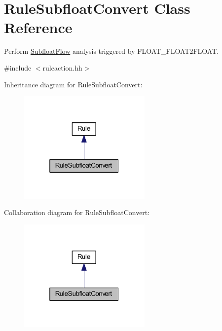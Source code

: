 \hypertarget{class_rule_subfloat_convert}{}\section{Rule\+Subfloat\+Convert Class Reference}
\label{class_rule_subfloat_convert}


Perform \mbox{\hyperlink{class_subfloat_flow}{Subfloat\+Flow}} analysis triggered by F\+L\+O\+A\+T\+\_\+\+F\+L\+O\+A\+T2\+F\+L\+O\+AT.  




{\ttfamily \#include $<$ruleaction.\+hh$>$}



Inheritance diagram for Rule\+Subfloat\+Convert\+:
\nopagebreak
\begin{figure}[H]
\begin{center}
\leavevmode
\includegraphics[width=184pt]{class_rule_subfloat_convert__inherit__graph}
\end{center}
\end{figure}


Collaboration diagram for Rule\+Subfloat\+Convert\+:
\nopagebreak
\begin{figure}[H]
\begin{center}
\leavevmode
\includegraphics[width=184pt]{class_rule_subfloat_convert__coll__graph}
\end{center}
\end{figure}

